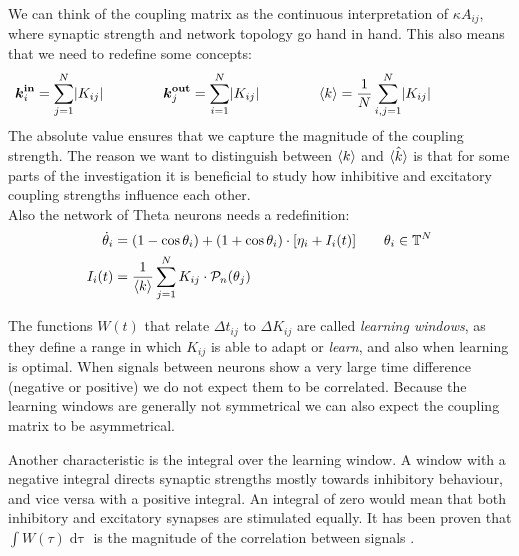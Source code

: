 We can think of the coupling matrix as the continuous interpretation of $\kappa A_{ij}$, where synaptic strength and network topology go hand in hand. This also means that we need to redefine some concepts:
\begin{align}
\kinbi = \sum_{j=1}^{N} \rvert K_{i j} \rvert \hspace{15mm} 
\koutbj = \sum_{i=1}^{N} \rvert K_{i j} \rvert \hspace{15mm} 
\kmean &= \frac{1}{N} \sum_{i,j=1}^{N} \rvert K_{i j} \rvert \hspace{15mm}  \label{eq:redefineFromK}  %
\end{align}
The absolute value ensures that we capture the magnitude of the coupling strength. The reason we want to distinguish between ${\langle k\rangle}$ and $\hat{{\langle k\rangle}}$ is that for some parts of the investigation it is beneficial to study how inhibitive and excitatory coupling strengths influence each other.\\

Also the network of Theta neurons needs a redefinition:
\begin{align}
\dot{\theta}_{i} &=\left(1-\cos \theta_{i}\right)+\left(1+\cos \theta_{i}\right) \cdot \left[\eta_{i} + I_{i}(t)\right] \qquad \theta_i \in \T^N  \label{eq:thetaneuronnetwork_adaptive} \\
I_{i}(t) &=\frac{1}{\kmean} \sum_{j=1}^{N} K_{i j} \cdot \mathcal{P}_{n}(\theta_{j}) \label{eq:thetaneuronnetworkcurrent_adaptive}
\end{align}


The functions $W(t)$ that relate $\Delta t_{ij}$ to $\Delta K_{ij}$ are called \textsl{learning windows},  as they define a range in which $K_{ij}$ is able to adapt or \textsl{learn}, and also when learning is optimal. When signals between neurons show a very large time difference (negative or positive) we do not expect them to be correlated. Because the learning windows are generally not symmetrical we can also expect the coupling matrix to be asymmetrical.

Another characteristic is the integral over the learning window. A window with a negative integral directs synaptic strengths mostly towards inhibitory behaviour, and vice versa with a positive integral. An integral of zero would mean that both inhibitory and excitatory synapses are stimulated equally. It has been proven that $\int W(\tau) \mathop{d\tau}$ is the magnitude of the correlation between signals \cite{Gerstner2002}. \\

